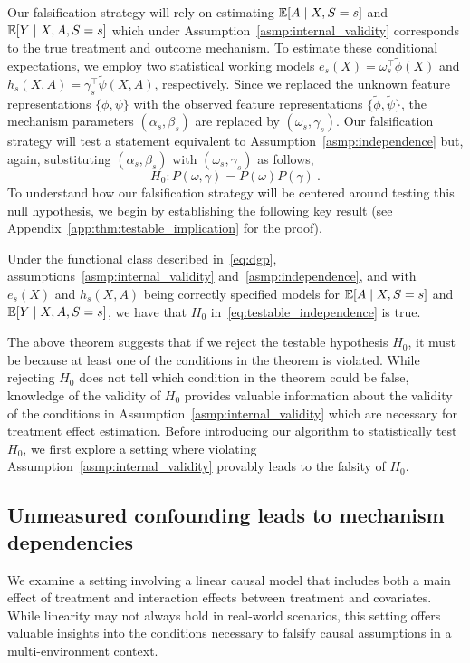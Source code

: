 \documentclass{article}
\begin{document}
Our falsification strategy will rely on estimating $\mathbb{E}[A \mid X, S=s]$ and $\mathbb{E}[Y \mid X, A, S=s]$ which under Assumption~\ref*{asmp:internal_validity} corresponds to the true treatment and outcome mechanism. To estimate these conditional expectations, we employ two statistical working models $e_s(X) = \omega_s^\top \widetilde{\phi}(X)$ and $h_s(X, A) = \gamma_s^\top \widetilde{\psi}(X, A)$, respectively. Since we replaced the unknown feature representations $\{\phi, \psi\}$ with the observed feature representations $\{\widetilde\phi, \widetilde\psi\}$, the mechanism parameters $(\alpha_s, \beta_s)$ are replaced by $(\omega_s, \gamma_s)$. Our falsification strategy will test a statement equivalent to Assumption~\ref*{asmp:independence} but, again, substituting $(\alpha_s, \beta_s)$ with $(\omega_s, \gamma_s)$ as follows,
\begin{equation} \label{eq:testable_independence}
    H_0 : P(\omega
,\gamma)=P(\omega)P(\gamma)~.
\end{equation}
To understand how our falsification strategy will be centered around testing this null hypothesis, we begin by establishing the following key result (see Appendix~\ref{app:thm:testable_implication} for the proof).

\begin{theorem}\label{thm:testable_implication} 
    Under the functional class described in~\eqref{eq:dgp}, assumptions~\ref*{asmp:internal_validity} and~\ref*{asmp:independence}, and with $e_s(X)$ and $h_{s}(X,A)$ being correctly specified models for $\mathbb{E}[A\mid X, S=s]$ and $\mathbb{E}[Y\mid X, A, S=s]$, we have that $H_0$ in~\eqref{eq:testable_independence} is true.
\end{theorem}
The above theorem suggests that if we reject the testable hypothesis $H_0$, it must be because at least one of the conditions in the theorem is violated. While rejecting $H_0$ does not tell which condition in the theorem could be false, knowledge of the validity of $H_0$ provides valuable information about the validity of the conditions in Assumption~\ref*{asmp:internal_validity} which are necessary for treatment effect estimation. Before introducing our algorithm to statistically test $H_0$, we first explore a setting where violating Assumption~\ref*{asmp:internal_validity} provably leads to the falsity of $H_0$.

\subsection{Unmeasured confounding leads to mechanism dependencies}
\label{sec:linear_case}
We examine a setting involving a linear causal model that includes both a main effect of treatment and interaction effects between treatment and covariates. While linearity may not always hold in real-world scenarios, this setting offers valuable insights into the conditions necessary to falsify causal assumptions in a multi-environment context. 
\end{document}

